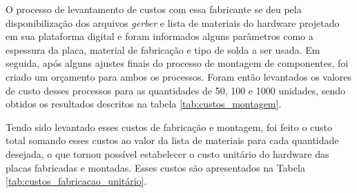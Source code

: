 O processo de levantamento de custos com essa fabricante se deu pela disponibilização dos arquivos \textit{gerber} e lista de materiais do hardware projetado em sua plataforma digital e foram informados alguns parâmetros como a espessura da placa, material de fabricação e tipo de solda a ser usada. Em seguida, após alguns ajustes finais do processo de montagem de componentes, foi criado um orçamento para ambos os processos. Foram então levantados os valores de custo desses processos para as quantidades de 50, 100 e 1000 unidades, sendo obtidos os resultados descritos na tabela \ref{tab:custos_montagem}.

	\begin{table}[!h]
	\captionsetup{width=9cm}%
    \end{table}
Tendo sido levantado esses custos de fabricação e montagem, foi feito o custo total somando esses custos ao valor da lista de materiais para cada quantidade desejada, o que tornou possível estabelecer o custo unitário do hardware das placas fabricadas e montadas. Esses custos são apresentados na Tabela \ref{tab:custos_fabricacao_unitário}.


	\begin{table}[!h]
	\captionsetup{width=7cm}%
    \end{table}


